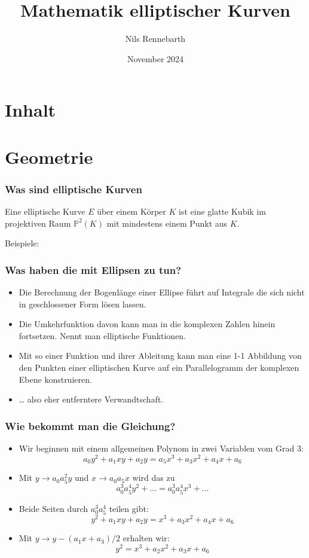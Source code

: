 \documentclass{beamer}
\title{Mathematik elliptischer Kurven}
\author{Nils Rennebarth}
\date{November 2024}
\newcommand{\Proj}{\mathbb{P}}
\begin{document}
\begin{frame}
  \titlepage
\end{frame}

\section*{Inhalt}
\begin{frame}
  \tableofcontents
\end{frame}

\section{Geometrie}
\begin{frame}

  \frametitle{Was sind elliptische Kurven}

  \begin{definition}
    Eine elliptische Kurve $E$ über einem Körper $K$ ist eine glatte Kubik im
    projektiven Raum $\Proj^2(K)$ mit mindestens einem Punkt aus $K$.
  \end{definition}

  \pause

  Beispiele:

  

\end{frame}

\begin{frame}
  \frametitle{Was haben die mit Ellipsen zu tun?}
  \begin{itemize}
  \item Die Berechnung der Bogenlänge einer Ellipse führt auf Integrale die
    sich nicht in geschlossener Form lösen lassen.
  \item Die Umkehrfunktion davon kann man in die komplexen Zahlen hinein
    fortsetzen. Nennt man elliptische Funktionen.
  \item Mit so einer Funktion und ihrer Ableitung kann man eine 1-1 Abbildung
    von den Punkten einer elliptischen Kurve auf ein Parallelogramm der
    komplexen Ebene konstruieren.
  \item \dots{} also eher entferntere Verwandtschaft.
  \end{itemize}
\end{frame}

\begin{frame}
  \frametitle{Wie bekommt man die Gleichung?}
  \begin{itemize}
  \item Wir beginnen mit einem allgemeinen Polynom in zwei Variablen vom
    Grad 3:
    $$ a_0 y^2 + a_1 xy + a_2 y = a_5 x^3 + a_3 x^2 + a_4 x + a_6 $$
  \item Mit $y \to a_0 a_5^2 y $ und $x \to a_0 a_5 x $ wird das zu
    $$ a_0^3 a_5^4 y^2 + \dots = a_0^3 a_5^4 x^3 + \dots $$
  \item Beide Seiten durch $a_0^3 a_5^4$ teilen gibt:
    $$ y^2 + a_1 xy + a_2 y = x^3 + a_3 x^2 + a_4 x + a_6 $$
  \item Mit $y \to y - (a_1 x + a_3)/2$ erhalten wir:
    $$ y^2 = x^3 + a_2 x^2 + a_3 x + a_6 $$
  \end{itemize}
\end{frame}
\end{document}
